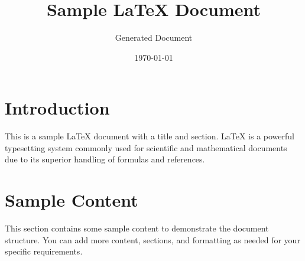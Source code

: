 \documentclass{article}
\title{Sample LaTeX Document}
\author{Generated Document}
\date{\today}
\begin{document}
\maketitle

\section{Introduction}
This is a sample LaTeX document with a title and section. LaTeX is a powerful typesetting system commonly used for scientific and mathematical documents due to its superior handling of formulas and references.

\section{Sample Content}
This section contains some sample content to demonstrate the document structure. You can add more content, sections, and formatting as needed for your specific requirements.
\end{document}
